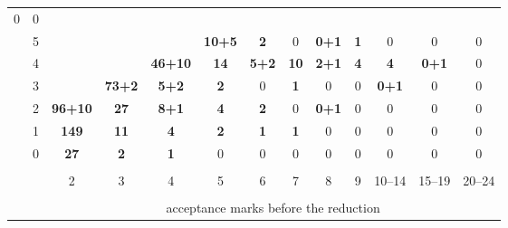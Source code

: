 \begin{tabular}{cc|ccccccccccc|}
\footnotesize{0}
 & 
\footnotesize{0}
\\
 & 
5
 & 
\footnotesize{}
 & 
\footnotesize{}
 & 
\footnotesize{}
 & 
\footnotesize{\cellcolor{blue!10}\textbf{10+5}}
 & 
\footnotesize{\cellcolor{blue!5}\textbf{2}}
 & 
\footnotesize{0}
 & 
\footnotesize{\cellcolor{blue!5}\textbf{0+1}}
 & 
\footnotesize{\cellcolor{blue!5}\textbf{1}}
 & 
\footnotesize{0}
 & 
\footnotesize{0}
 & 
\footnotesize{0}
\\
 & 
4
 & 
\footnotesize{}
 & 
\footnotesize{}
 & 
\footnotesize{\cellcolor{blue!23}\textbf{46+10}}
 & 
\footnotesize{\cellcolor{blue!9}\textbf{14}}
 & 
\footnotesize{\cellcolor{blue!7}\textbf{5+2}}
 & 
\footnotesize{\cellcolor{blue!8}\textbf{10}}
 & 
\footnotesize{\cellcolor{blue!6}\textbf{2+1}}
 & 
\footnotesize{\cellcolor{blue!6}\textbf{4}}
 & 
\footnotesize{\cellcolor{blue!6}\textbf{4}}
 & 
\footnotesize{\cellcolor{blue!5}\textbf{0+1}}
 & 
\footnotesize{0}
\\
 & 
3
 & 
\footnotesize{}
 & 
\footnotesize{\cellcolor{blue!30}\textbf{73+2}}
 & 
\footnotesize{\cellcolor{blue!7}\textbf{5+2}}
 & 
\footnotesize{\cellcolor{blue!5}\textbf{2}}
 & 
\footnotesize{0}
 & 
\footnotesize{\cellcolor{blue!5}\textbf{1}}
 & 
\footnotesize{0}
 & 
\footnotesize{0}
 & 
\footnotesize{\cellcolor{blue!5}\textbf{0+1}}
 & 
\footnotesize{0}
 & 
\footnotesize{0}
\\
 & 
2
 & 
\footnotesize{\cellcolor{blue!40}\textbf{96+10}}
 & 
\footnotesize{\cellcolor{blue!14}\textbf{27}}
 & 
\footnotesize{\cellcolor{blue!8}\textbf{8+1}}
 & 
\footnotesize{\cellcolor{blue!6}\textbf{4}}
 & 
\footnotesize{\cellcolor{blue!5}\textbf{2}}
 & 
\footnotesize{0}
 & 
\footnotesize{\cellcolor{blue!5}\textbf{0+1}}
 & 
\footnotesize{0}
 & 
\footnotesize{0}
 & 
\footnotesize{0}
 & 
\footnotesize{0}
\\
 & 
1
 & 
\footnotesize{\cellcolor{blue!54}\textcolor{black!10}{\textbf{149}}}
 & 
\footnotesize{\cellcolor{blue!8}\textbf{11}}
 & 
\footnotesize{\cellcolor{blue!6}\textbf{4}}
 & 
\footnotesize{\cellcolor{blue!5}\textbf{2}}
 & 
\footnotesize{\cellcolor{blue!5}\textbf{1}}
 & 
\footnotesize{\cellcolor{blue!5}\textbf{1}}
 & 
\footnotesize{0}
 & 
\footnotesize{0}
 & 
\footnotesize{0}
 & 
\footnotesize{0}
 & 
\footnotesize{0}
\\
 & 
0
 & 
\footnotesize{\cellcolor{blue!14}\textbf{27}}
 & 
\footnotesize{\cellcolor{blue!5}\textbf{2}}
 & 
\footnotesize{\cellcolor{blue!5}\textbf{1}}
 & 
\footnotesize{0}
 & 
\footnotesize{0}
 & 
\footnotesize{0}
 & 
\footnotesize{0}
 & 
\footnotesize{0}
 & 
\footnotesize{0}
 & 
\footnotesize{0}
 & 
\footnotesize{0}
\\
\cline{3-13}\vspace{-10pt}\\
\multicolumn{2}{c}{}
 & 
2
 & 
3
 & 
4
 & 
5
 & 
6
 & 
7
 & 
8
 & 
9
 & 
10--14
 & 
15--19
 & 
\multicolumn{1}{c}{20--24}

    \\
    \vspace{-10pt}\\
    \multicolumn{2}{c}{} & \multicolumn{11}{c}{acceptance marks before the reduction} \\
    \end{tabular}
    
